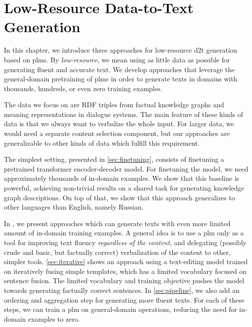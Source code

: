 \chapter{Low-Resource Data-to-Text Generation}
\label{chap:low-res}


In this chapter, we introduce three approaches for low-resource \ac{d2t} generation based on \acp{plm}. By \emph{low-resource}, we mean using as little data as possible for generating fluent and accurate text. We develop approaches that leverage the general-domain pretraining of \acp{plm} in order to generate texts in domains with thousands, hundreds, or even zero training examples.

The data we focus on are RDF triples from factual knowledge graphs and meaning representations in dialogue systems. The main feature of these kinds of data is that we always want to verbalize the whole input. For larger data, we would need a separate content selection component, but our approaches are generalizable to other kinds of data which fulfill this requirement.

The simplest setting, presented in \autoref{sec:finetuning}, consists of finetuning a pretrained transformer encoder-decoder model. For finetuning the model, we need approximately thousands of in-domain examples. We show that this baseline is powerful, achieving non-trivial results on a shared task for generating knowledge graph descriptions. On top of that, we show that this approach generalizes to other languages than English, namely Russian.

In , we present approaches which can generate texts with even more limited amount of in-domain training examples. A general idea is to use a \ac{plm} only as a tool for improving text fluency \emph{regardless of the content}, and delegating (possibly crude and basic, but factually correct) verbalization of the content to other, simpler tools. \autoref{sec:iterative} shows an approach using a text-editing model trained on iteratively fusing simple templates, which has a limited vocabulary focused on sentence fusion. The limited vocabulary and training objective pushes the model towards generating factually correct sentences. In \autoref{sec:pipeline}, we also add an ordering and aggregation step for generating more fluent texts. For each of these steps, we can train a \ac{plm} on general-domain operations, reducing the need for in-domain examples to zero.

